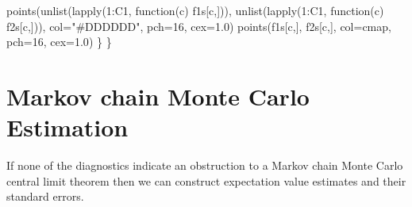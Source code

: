 \documentclass[
  letterpaper,
  DIV=11,
  numbers=noendperiod]{scrartcl}
\newenvironment{Shaded}{\begin{snugshade}}{\end{snugshade}}
\newcommand{\AttributeTok}[1]{\textcolor[rgb]{0.40,0.45,0.13}{#1}}
\newcommand{\ControlFlowTok}[1]{\textcolor[rgb]{0.00,0.23,0.31}{#1}}
\newcommand{\DecValTok}[1]{\textcolor[rgb]{0.68,0.00,0.00}{#1}}
\newcommand{\FloatTok}[1]{\textcolor[rgb]{0.68,0.00,0.00}{#1}}
\newcommand{\FunctionTok}[1]{\textcolor[rgb]{0.28,0.35,0.67}{#1}}
\newcommand{\NormalTok}[1]{\textcolor[rgb]{0.00,0.23,0.31}{#1}}
\newcommand{\SpecialCharTok}[1]{\textcolor[rgb]{0.37,0.37,0.37}{#1}}
\newcommand{\StringTok}[1]{\textcolor[rgb]{0.13,0.47,0.30}{#1}}
\begin{document}
\begin{Shaded}
\begin{Highlighting}[]
    \FunctionTok{points}\NormalTok{(}\FunctionTok{unlist}\NormalTok{(}\FunctionTok{lapply}\NormalTok{(}\DecValTok{1}\SpecialCharTok{:}\NormalTok{C1, }\ControlFlowTok{function}\NormalTok{(c) f1s[c,])),}
           \FunctionTok{unlist}\NormalTok{(}\FunctionTok{lapply}\NormalTok{(}\DecValTok{1}\SpecialCharTok{:}\NormalTok{C1, }\ControlFlowTok{function}\NormalTok{(c) f2s[c,])),}
           \AttributeTok{col=}\StringTok{"\#DDDDDD"}\NormalTok{, }\AttributeTok{pch=}\DecValTok{16}\NormalTok{, }\AttributeTok{cex=}\FloatTok{1.0}\NormalTok{)}
    \FunctionTok{points}\NormalTok{(f1s[c,], f2s[c,], }\AttributeTok{col=}\NormalTok{cmap, }\AttributeTok{pch=}\DecValTok{16}\NormalTok{, }\AttributeTok{cex=}\FloatTok{1.0}\NormalTok{)}
\NormalTok{  \}}
\NormalTok{\}}
\end{Highlighting}
\end{Shaded}

\hypertarget{markov-chain-monte-carlo-estimation}{%
\section{Markov chain Monte Carlo
Estimation}\label{markov-chain-monte-carlo-estimation}}

If none of the diagnostics indicate an obstruction to a Markov chain
Monte Carlo central limit theorem then we can construct expectation
value estimates and their standard errors.
\end{document}
